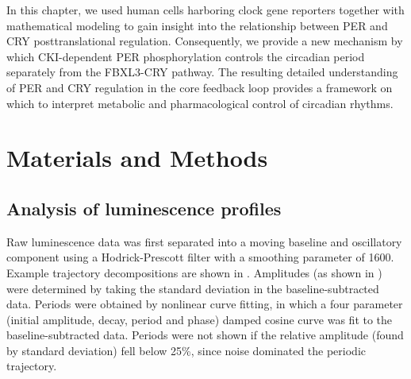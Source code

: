 In this chapter, we used human cells harboring clock gene reporters together with mathematical modeling to gain insight into the relationship between PER and CRY posttranslational regulation. 
Consequently, we provide a new mechanism by which CKI-dependent PER phosphorylation controls the circadian period separately from the FBXL3-CRY pathway. 
The resulting detailed understanding of PER and CRY regulation in the core feedback loop provides a framework on which to interpret metabolic and pharmacological control of circadian rhythms.

\section{Materials and Methods}
\subsection{Analysis of luminescence profiles}
Raw luminescence data was first separated into a moving baseline and oscillatory component using a Hodrick-Prescott filter with a smoothing parameter of 1600. 
Example trajectory decompositions are shown in . 
Amplitudes (as shown in ) were determined by taking the standard deviation in the baseline-subtracted data. 
Periods were obtained by nonlinear curve fitting, in which a four parameter (initial amplitude, decay, period and phase) damped cosine curve was fit to the baseline-subtracted data. 
Periods were not shown if the relative amplitude (found by standard deviation) fell below 25\%, since noise dominated the periodic trajectory. 

